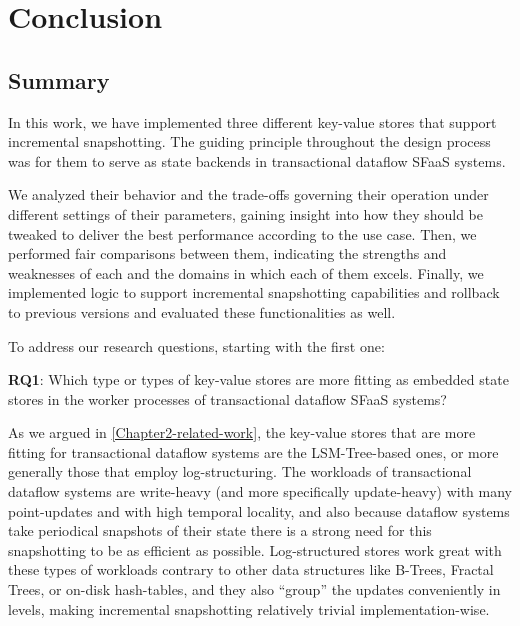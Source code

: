 
\chapter{Conclusion}

\label{Chapter5-conclusion}

\section{Summary}

In this work, we have implemented three different key-value stores that support incremental snapshotting. The guiding principle throughout the design process was for them to serve as state backends in transactional dataflow SFaaS systems.

We analyzed their behavior and the trade-offs governing their operation under different settings of their parameters, gaining insight into how they should be tweaked to deliver the best performance according to the use case.
Then, we performed fair comparisons between them, indicating the strengths and weaknesses of each and the domains in which each of them excels.
Finally, we implemented logic to support incremental snapshotting capabilities and rollback to previous versions and evaluated these functionalities as well.

To address our research questions, starting with the first one:

\begin{tcolorbox}
    \textbf{RQ1}: Which type or types of key-value stores are more fitting as embedded state stores in the worker processes of transactional dataflow SFaaS systems?
\end{tcolorbox}

As we argued in \ref{Chapter2-related-work}, the key-value stores that are more fitting for transactional dataflow systems are the LSM-Tree-based ones, or more generally those that employ log-structuring.
The workloads of transactional dataflow systems are write-heavy (and more specifically update-heavy) with many point-updates and with high temporal locality, and also because dataflow systems take periodical snapshots of their state there is a strong need for this snapshotting to be as efficient as possible.
Log-structured stores work great with these types of workloads contrary to other data structures like B-Trees, Fractal Trees, or on-disk hash-tables, and they also ``group'' the updates conveniently in levels, making incremental snapshotting relatively trivial implementation-wise.

